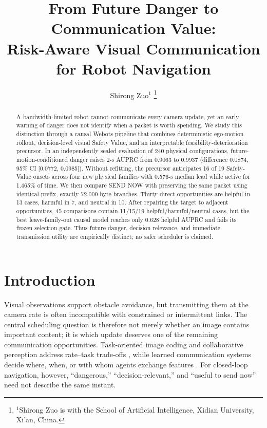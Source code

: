 \documentclass[letterpaper,10pt,conference]{ieeeconf}
\title{\LARGE \bf
From Future Danger to Communication Value:\\
Risk-Aware Visual Communication for Robot Navigation}
\author{Shirong Zuo$^{1}$%
\thanks{$^{1}$Shirong Zuo is with the School of Artificial Intelligence,
Xidian University, Xi'an, China.}}
\begin{document}
\maketitle
\thispagestyle{empty}
\pagestyle{empty}

\begin{abstract}
A bandwidth-limited robot cannot communicate every camera update, yet an early
warning of danger does not identify when a packet is worth spending. We study
this distinction through a causal Webots pipeline that combines deterministic
ego-motion rollout, decision-level visual Safety Value, and an interpretable
feasibility-deterioration precursor. In an independently sealed evaluation of
240 physical configurations, future-motion-conditioned danger raises 2-s
AUPRC from 0.9063 to 0.9937 (difference 0.0874, 95\% CI
[0.0772, 0.0985]). Without refitting, the precursor anticipates 16 of 19
Safety-Value onsets across four new physical families with 0.576-s median lead
while active for 1.465\% of time. We then compare SEND NOW with preserving the
same packet using identical-prefix, exactly 72,000-byte branches. Thirty direct
opportunities are helpful in 13 cases, harmful in 7, and neutral in 10. After
repairing the target to adjacent opportunities, 45 comparisons contain
11/15/19 helpful/harmful/neutral cases, but the best leave-family-out causal
model reaches only 0.628 helpful AUPRC and fails its frozen selection gate.
Thus future danger, decision relevance, and immediate transmission utility are
empirically distinct; no safer scheduler is claimed.
\end{abstract}

\section{Introduction}

Visual observations support obstacle avoidance, but transmitting them at the
camera rate is often incompatible with constrained or intermittent links. The
central scheduling question is therefore not merely whether an image contains
important content; it is which update deserves one of the remaining
communication opportunities. Task-oriented image coding and collaborative
perception address rate--task trade-offs \cite{liu2022task,hu2022where2comm},
while learned communication systems decide where, when, or with whom agents
exchange features \cite{liu2020when2com,wang2020v2vnet}. For closed-loop
navigation, however, ``dangerous,'' ``decision-relevant,'' and ``useful to send
now'' need not describe the same instant.
\end{document}
